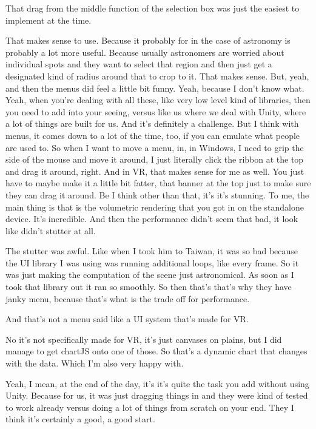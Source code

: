 \begin{description}
  \mich That drag from the middle function of the selection box was just the easiest to implement at the time.

  \alex That makes sense to use. Because it probably for in the case of astronomy is probably a lot more useful. Because usually astronomers are worried about individual spots and they want to select that region and then just get a designated kind of radius around that to crop to it. That makes sense. But, yeah, and then the menus did feel a little bit funny. Yeah, because I don't know what. Yeah, when you're dealing with all these, like very low level kind of libraries, then you need to add into your seeing, versus like us where we deal with Unity, where a lot of things are built for us. And it's definitely a challenge. But I think with menus, it comes down to a lot of the time, too, if you can emulate what people are used to. So when I want to move a menu, in, in Windows, I need to grip the side of the mouse and move it around, I just literally click the ribbon at the top and drag it around, right. And in VR, that makes sense for me as well. You just have to maybe make it a little bit fatter, that banner at the top just to make sure they can drag it around. Be I think other than that, it's it's stunning. To me, the main thing is that is the volumetric rendering that you got in on the standalone device. It's incredible. And then the performance didn't seem that bad, it look like didn't stutter at all.

  \mich The stutter was awful. Like when I took him to Taiwan, it was so bad because the UI library I was using was running additional loops, like every frame. So it was just making the computation of the scene just astronomical. As soon as I took that library out it ran so smoothly. So then that's that's why they have janky menu, because that's what is the trade off for performance.

  \alex And that's not a menu said like a UI system that's made for VR.

  \mich No it's not specifically made for VR, it's just canvases on plains, but I did manage to get chartJS onto one of those. So that's a dynamic chart that changes with the data. Which I'm also very happy with.

  \alex Yeah, I mean, at the end of the day, it's it's quite the task you add without using Unity. Because for us, it was just dragging things in and they were kind of tested to work already versus doing a lot of things from scratch on your end. They I think it's certainly a good, a good start.


\end{description}
